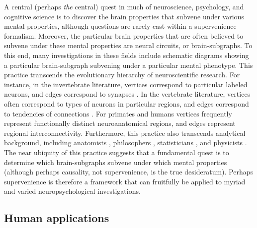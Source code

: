 \documentclass{article}
\newcommand{\mB}{\mathcal{B}}
\newcommand{\mM}{\mathcal{M}}
\newcommand{\PP}{\mathbb{P}}           %
\newcommand{\MeB}{\mM \overset{\varepsilon}{{\sim}}_{\PP} \mB}
\begin{document}
A central (perhaps \emph{the} central) quest in much of neuroscience, psychology, and cognitive science is to discover the brain properties that subvene under various mental properties, although questions are rarely cast within a  supervenience formalism.  Moreover, the particular brain properties that are often believed to subvene under these mental properties are neural circuits, or brain-subgraphs.  To this end, many investigations in these fields include schematic diagrams showing a particular brain-subgraph subvening under a particular mental phenotype. This practice transcends the evolutionary hierarchy of neuroscientific research.  For instance, in the invertebrate literature, vertices correspond to particular labeled neurons, and edges correspond to synapses \cite{NorthGreenspan07}.  In the vertebrate literature, vertices often correspond to types of neurons in particular regions, and edges correspond to tendencies of connections \cite{Shepherd04}.  For primates \cite{Felleman_VanEssen91} and humans \cite{Mori05} vertices frequently represent functionally distinct neuroanatomical regions, and edges represent regional interconnectivity. Furthermore, this practice also transcends analytical background, including anatomists \cite{Abeles91}, philosophers \cite{Koch_Davis94}, statisticians \cite{Rao_Lewicki02}, and physicists \cite{Chow_Dalibard03}.  The near ubiquity of this practice suggests that a fundamental quest is to determine which brain-subgraphs subvene under which mental properties (although perhaps causality, not supervenience, is the true desideratum).  Perhaps supervenience is therefore a framework that can fruitfully be applied to myriad and varied neuropsychological investigations.




% 
% 

\subsection{Human applications} %
\label{par:human_applications}
\end{document}
